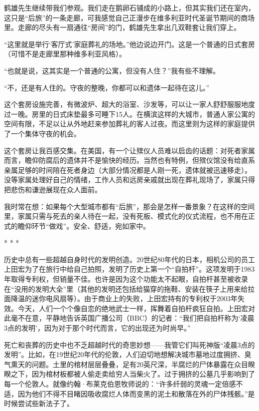 \documentclass[12pt,oneside]{book}
\begin{document}
鹤雄先生继续带我们参观。我们走在鹅卵石铺成的小路上，但其实我们还在室内，这只是“后旅”的一条走廊，可我感觉自己正漫步在维多利亚时代圣诞节期间的商场里。走廊的尽头有一扇通往“房间”的门，鹤雄先生拿出几双鞋套让我们穿上。

“这里就是举行‘客厅式’家庭葬礼的场地。”他边说边开门。这是一个普通的日式套房（可惜不是走廊里那种维多利亚风格）。

“也就是说，这其实是一个普通的公寓，但没有人住？”我有些不理解。

“不，还是有人住的。守夜的整晚，你都可以和遗体一起待在这儿。”

这个套房设施完善，有微波炉、超大的浴室、沙发等，可以让一家人舒舒服服地度过一晚。房里的日式床垫最多可睡下15人。在横滨这样的大城市，普通人家公寓的空间有限，不足以让从外地赶来参加葬礼的客人过夜。而这里则为这样的家庭提供了一个集体守夜的机会。

这个套房让我百感交集。在美国，有一个让殡仪人员难以启齿的话题：对死者家属而言，瞻仰防腐后的遗体并不是愉快的经历。当然也有特例，但殡仪馆没有给直系亲属足够的时间陪在死者身边（大部分情况都是人刚一死，遗体就被迅速移走）。没等家属处理好自己的情绪，工作人员和远房亲戚就出现在葬礼现场了，家属只得把悲伤和谦逊展现在众人面前。

我时常在想：如果每个大型城市都有“后旅”，那会是怎样一番景象？在这样的空间里，家属只需与死去的亲人待在一起，没有死板、模式化的仪式流程，也不用在正式的瞻仰环节“做戏”。安全、舒适，宛如家中。
\begin{center}
* * *
\end{center}

历史中总有一些超越自身时代的发明创造。20世纪80年代的日本，相机公司的员工上田宏为了在旅行中给自己拍照，发明了历史上第一个“自拍杆”。这项发明于1983年取得专利权，但销量不佳。也许是因为这个功能太不起眼，自拍杆甚至被收录在“没用的发明大全”里（其他的发明还包括给猫穿的拖鞋、安装在筷子上用来给拉面降温的迷你电风扇等）。由于商业上的失败，上田宏持有的专利权于2003年失效。今天，人们一个个像自恋的绝地武士一样，挥舞着自拍杆疯狂自拍。上田宏对此毫不在意，平静地告诉英国广播公司（BBC）的记者：“我们把自拍杆称为‘凌晨3点的发明’，因为对于那个时代而言，它的出现还为时尚早。”

死亡和丧葬的历史中也不乏超越时代的奇思妙想——我管它们叫死神版“凌晨3点的发明”。比如，在19世纪20年代的伦敦，人们迫切地想解决城市墓地过度拥挤、臭气熏天的问题。土里的棺材层层叠叠，足有20英尺深，半腐烂的尸体暴露在众目睽睽之下，因为棺材板都被人偷走卖给穷人当柴火了。过于拥挤的公墓几乎影响到了每一个伦敦人。就像约翰·布莱克伯恩牧师说的：“许多纤弱的灵魂一定倍感不适，因为他们不得不目睹因吸收腐烂人体而变黑的泥土和散落在外的尸体残骸。”是时候尝试些新法子了。
\end{document}
